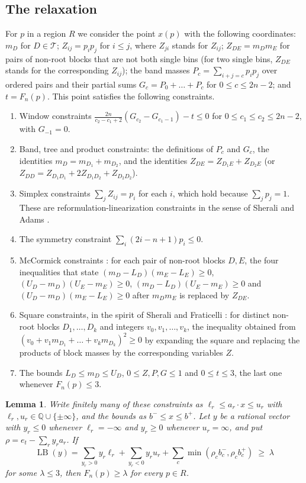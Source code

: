 \documentclass[11pt]{amsart}
\newtheorem{lemma}[theorem]{Lemma}
\theoremstyle{definition}
\theoremstyle{remark}
\numberwithin{equation}{section}
\newcommand{\Q}{\mathbb{Q}}
\newcommand{\LB}{\operatorname{LB}}
\begin{document}
\subsection{The relaxation} For $p$ in a region $R$ we consider the point $x(p)$ with the following coordinates: $m_D$ for $D\in\mathcal{T}$; $Z_{ij}=p_ip_j$ for $i\le j$, where $Z_{ji}$ stands for $Z_{ij}$; $Z_{DE}=m_Dm_E$ for pairs of non-root blocks that are not both single bins (for two single bins, $Z_{DE}$ stands for the corresponding $Z_{ij}$); the band masses $P_c=\sum_{i+j=c}p_ip_j$ over ordered pairs and their partial sums $G_c=P_0+\dots+P_c$ for $0\le c\le 2n-2$; and $t=F_n(p)$. This point satisfies the following constraints.
\begin{enumerate}[label=(\roman*)]
\item\label{c:win} Window constraints $\frac{2n}{c_2-c_1+2}(G_{c_2}-G_{c_1-1})-t\le0$ for $0\le c_1\le c_2\le 2n-2$, with $G_{-1}=0$.
\item Band, tree and product constraints: the definitions of $P_c$ and $G_c$, the identities $m_D=m_{D_1}+m_{D_2}$, and the identities $Z_{DE}=Z_{D_1E}+Z_{D_2E}$ (or $Z_{DD}=Z_{D_1D_1}+2Z_{D_1D_2}+Z_{D_2D_2}$).
\item Simplex constraints $\sum_jZ_{ij}=p_i$ for each $i$, which hold because $\sum_jp_j=1$. These are reformulation-linearization constraints in the sense of Sherali and Adams \cite{SA90}.
\item The symmetry constraint $\sum_i(2i-n+1)p_i\le0$.
\item\label{c:mc} McCormick constraints \cite{McC76}: for each pair of non-root blocks $D,E$, the four inequalities that state $(m_D-L_D)(m_E-L_E)\ge0$, $(U_D-m_D)(U_E-m_E)\ge0$, $(m_D-L_D)(U_E-m_E)\ge0$ and $(U_D-m_D)(m_E-L_E)\ge0$ after $m_Dm_E$ is replaced by $Z_{DE}$.
\item\label{c:sq} Square constraints, in the spirit of Sherali and Fraticelli \cite{SF02}: for distinct non-root blocks $D_1,\dots,D_k$ and integers $v_0,v_1,\dots,v_k$, the inequality obtained from $(v_0+v_1m_{D_1}+\dots+v_km_{D_k})^2\ge0$ by expanding the square and replacing the products of block masses by the corresponding variables $Z$.
\item The bounds $L_D\le m_D\le U_D$, $0\le Z,P,G\le1$ and $0\le t\le3$, the last one whenever $F_n(p)\le 3$.
\end{enumerate}

\begin{lemma}\label{lem:duality}
Write finitely many of these constraints as $\ell_r\le a_r\cdot x\le u_r$ with $\ell_r,u_r\in\Q\cup\{\pm\infty\}$, and the bounds as $b^-\le x\le b^+$. Let $y$ be a rational vector with $y_r\le0$ whenever $\ell_r=-\infty$ and $y_r\ge0$ whenever $u_r=\infty$, and put $\rho=e_t-\sum_ry_ra_r$. If
\[
\LB(y)=\sum_{y_r>0}y_r\ell_r+\sum_{y_r<0}y_ru_r+\sum_c\min(\rho_cb^-_c,\rho_cb^+_c)\;\ge\;\lambda
\]
for some $\lambda\le3$, then $F_n(p)\ge\lambda$ for every $p\in R$.
\end{lemma}
\end{document}
